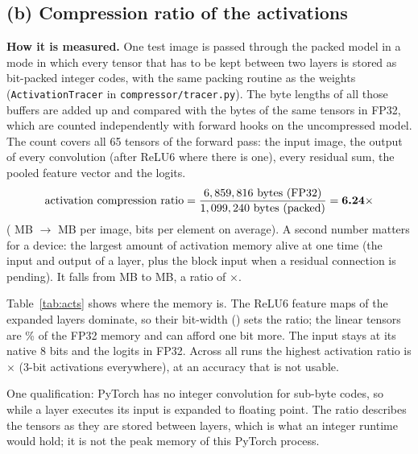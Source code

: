 \documentclass[11pt,a4paper]{article}
\begin{document}
\subsection*{(b) Compression ratio of the activations}

\textbf{How it is measured.} One test image is passed through the packed model in a mode in which every tensor that has to be kept between two layers is stored as bit-packed integer codes, with the same packing routine as the weights (\texttt{ActivationTracer} in \texttt{compressor/tracer.py}). The byte lengths of all those buffers are added up and compared with the bytes of the same tensors in FP32, which are counted independently with forward hooks on the uncompressed model. The count covers all 65 tensors of the forward pass: the input image, the output of every convolution (after ReLU6 where there is one), every residual sum, the pooled feature vector and the logits.
\[
\text{activation compression ratio} = \frac{6,859,816 \text{ bytes (FP32)}}{1,099,240 \text{ bytes (packed)}} = \textbf{6.24}\times
\]
(\FPActMB{} MB $\to$ \BestActMB{} MB per image, \BestAvgABits{} bits per element on average). A second number matters for a device: the largest amount of activation memory alive at one time (the input and output of a layer, plus the block input when a residual connection is pending). It falls from \FPActPeakMB{} MB to \BestActPeakMB{} MB, a ratio of \BestActPeakRatio$\times$.

Table~\ref{tab:acts} shows where the memory is. The ReLU6 feature maps of the expanded layers dominate, so their bit-width (\BestABits) sets the ratio; the linear tensors are \LinActPct\% of the FP32 memory and can afford one bit more. The input stays at its native 8 bits and the logits in FP32. Across all runs the highest activation ratio is \MaxActRatio$\times$ (3-bit activations everywhere), at an accuracy that is not usable.

One qualification: PyTorch has no integer convolution for sub-byte codes, so while a layer executes its input is expanded to floating point. The ratio describes the tensors as they are stored between layers, which is what an integer runtime would hold; it is not the peak memory of this PyTorch process.

\begin{table}[H]
\centering
\small
\resizebox{\linewidth}{!}{}
\caption{Activation tensors of one forward pass of one image, by type.}
\label{tab:acts}
\end{table}
\end{document}
